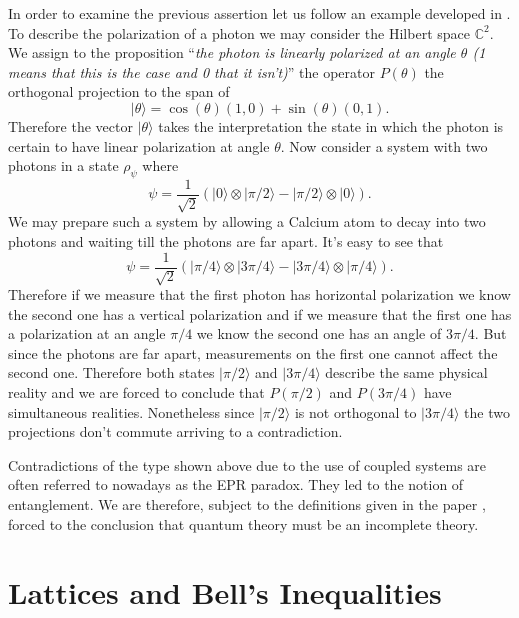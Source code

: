 \begin{example}\label{ex:Bell}
In order to examine the previous assertion let us follow an example developed in \cite{Reyes2013}. To describe the polarization of a photon we may consider the Hilbert space $\mathbb{C}^2$. We assign to the proposition ``\textit{the photon is linearly polarized at an angle $\theta$ (1 means that this is the case and 0 that it isn't)}'' the operator $P(\theta)$ the orthogonal projection to the span of 
\begin{equation}
|\theta\rangle=\cos(\theta)(1,0)+\sin(\theta)(0,1).
\end{equation}
Therefore the vector $|\theta\rangle$ takes the interpretation the state in which the photon is certain to have linear polarization at angle $\theta$. Now consider a system with two photons in a state $\rho_{\psi}$ where 
\begin{equation}
\psi=\frac{1}{\sqrt{2}}\left(|0\rangle\otimes|\pi/2\rangle-|\pi/2\rangle\otimes|0\rangle\right).
\end{equation}
We may prepare such a system by allowing a Calcium atom to decay into two photons and waiting till the photons are far apart. It's easy to see that 
\begin{equation}
\psi=\frac{1}{\sqrt{2}}\left(|\pi/4\rangle\otimes|3\pi/4\rangle-|3\pi/4\rangle\otimes|\pi/4\rangle\right).
\end{equation}
Therefore if we measure that the first photon has horizontal polarization we know the second one has a vertical polarization and if we measure that the first one has a polarization at an angle $\pi/4$ we know the second one has an angle of $3\pi/4$. But since the photons are far apart, measurements on the first one cannot affect the second one. Therefore both states $|\pi/2\rangle$ and $|3\pi/4\rangle$ describe the same physical reality and we are forced to conclude that $P(\pi/2)$ and $P(3\pi/4)$ have simultaneous realities. Nonetheless since $|\pi/2\rangle$ is not orthogonal to $|3\pi/4\rangle$ the two projections don't commute arriving to a contradiction. 
\end{example}

Contradictions of the type shown above due to the use of coupled systems are often referred to nowadays as the EPR paradox. They led to the notion of entanglement. We are therefore, subject to the definitions given in the paper \cite{Einstein1935}, forced to the conclusion that quantum theory must be an incomplete theory.  

\section{Lattices and Bell's Inequalities}

